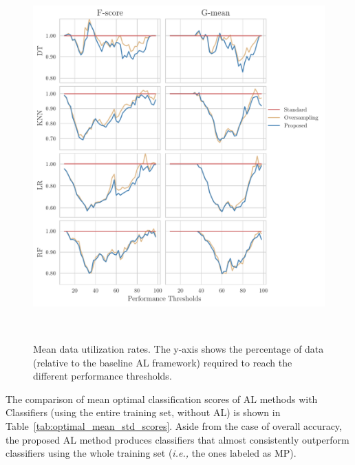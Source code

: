 \begin{figure}[t]
	\centering
	\includegraphics[width=.8\linewidth]{data_utilization_rate}
    \caption[Mean data utilization rates.]{%
        Mean data utilization rates. The y-axis shows the percentage of data
        (relative to the baseline AL framework) required to reach the
        different performance thresholds.
    }~\label{fig:dur}
\end{figure}

The comparison of mean optimal classification scores of AL methods with
Classifiers (using the entire training set, without AL) is shown in
Table~\ref{tab:optimal_mean_std_scores}. Aside from the case of overall
accuracy, the proposed AL method produces classifiers that almost consistently
outperform classifiers using the whole training set (\textit{i.e.,} the ones
labeled as MP).

\begin{table}
    \centering
    \caption[Optimal classification scores.]{%
        \label{tab:optimal_mean_std_scores}
        Optimal classification scores. The Maximum Performance (MP)
        classification scores are calculated using classifiers trained using
        the entire training set.
    }
\end{table}

